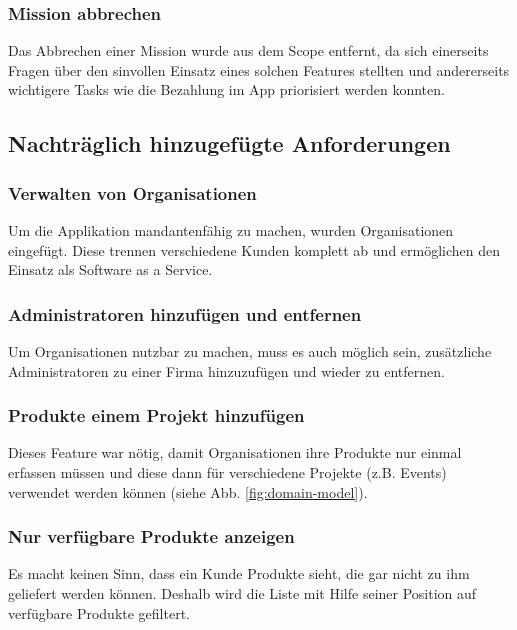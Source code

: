 \subsubsection{Mission abbrechen}

Das Abbrechen einer Mission wurde aus dem Scope entfernt, da sich einerseits Fragen über den sinvollen Einsatz eines solchen Features stellten und andererseits wichtigere Tasks wie die Bezahlung im App priorisiert werden konnten.

\subsection{Nachträglich hinzugefügte Anforderungen}

\subsubsection{Verwalten von Organisationen}

Um die Applikation mandantenfähig zu machen, wurden Organisationen eingefügt. Diese trennen verschiedene Kunden komplett ab und ermöglichen den Einsatz als Software as a Service.

\subsubsection{Administratoren hinzufügen und entfernen}

Um Organisationen nutzbar zu machen, muss es auch möglich sein, zusätzliche Administratoren zu einer Firma hinzuzufügen und wieder zu entfernen.

\subsubsection{Produkte einem Projekt hinzufügen}

Dieses Feature war nötig, damit Organisationen ihre Produkte nur einmal erfassen müssen und diese dann für verschiedene Projekte (z.B. Events) verwendet werden können (siehe Abb. \ref{fig:domain-model}).

\subsubsection{Nur verfügbare Produkte anzeigen}

Es macht keinen Sinn, dass ein Kunde Produkte sieht, die gar nicht zu ihm geliefert werden können. Deshalb wird die Liste mit Hilfe seiner Position auf verfügbare Produkte gefiltert.

